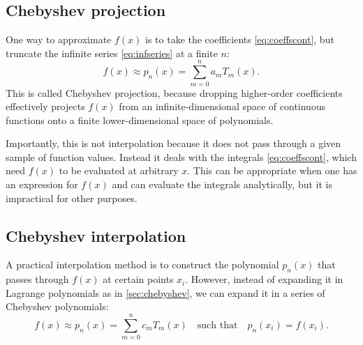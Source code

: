 \documentclass{aa}
\begin{document}
\subsection{Chebyshev projection}

One way to approximate $f(x)$ is to take the coefficients \eqref{eq:coeffscont},
but truncate the infinite series \eqref{eq:infseries} at a finite $n$:
\begin{equation}
	f(x) \approx \hat{p}_n(x) = \sum_{m=0}^n a_m T_m(x).
\label{eq:projection}
\end{equation}
This is called Chebyshev projection,
because dropping higher-order coefficients effectively projects $f(x)$ from an infinite-dimensional space of continuous functions
onto a finite lower-dimensional space of polynomials.

Importantly, this is not interpolation because it does not pass through a given sample of function values.
Instead it deals with the integrals \eqref{eq:coeffscont}, which need $f(x)$ to be evaluated at arbitrary $x$.
This can be appropriate when one has an expression for $f(x)$ and can evaluate the integrals analytically,
but it is impractical for other purposes.

\subsection{Chebyshev interpolation}

A practical interpolation method is to construct the polynomial $p_n(x)$ that passes through $f(x)$ at certain points $x_i$.
However, instead of expanding it in Lagrange polynomials as in \cref{sec:chebyshev},
we can expand it in a series of Chebyshev polynomials:
\begin{equation}
	f(x) \approx p_n(x) = \sum_{m=0}^n c_m T_m(x)
	\quad \text{such that} \quad
	p_n(x_i) = f(x_i).
\label{eq:interpolation}
\end{equation}
\end{document}
